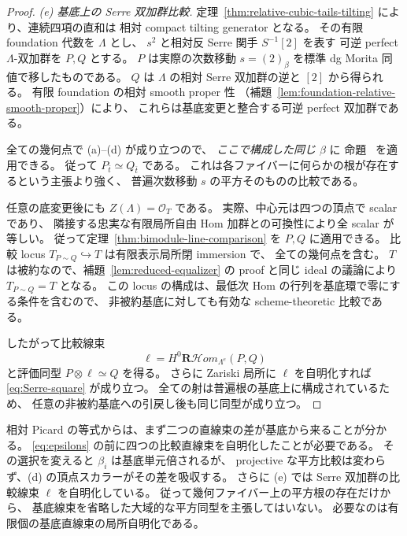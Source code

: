\begin{proof}
\emph{(e) 基底上の Serre 双加群比較.}
定理~\ref{thm:relative-cubic-tails-tilting} により、連続四項の直和は
相対 compact tilting generator となる。
その有限 foundation 代数を $\Lambda$ とし、
$s^2$ と相対反 Serre 関手 $S^{-1}[2]$ を表す
可逆 perfect $\Lambda$-双加群を $P,Q$ とする。
$P$ は実際の次数移動 $s=(2)_\beta$ を標準 dg Morita 同値で移したものである。
$Q$ は $\Lambda$ の相対 Serre 双加群の逆と $[2]$ から得られる。
有限 foundation の相対 smooth proper 性
（補題~\ref{lem:foundation-relative-smooth-proper}）により、
これらは基底変更と整合する可逆 perfect 双加群である。

全ての幾何点で (a)--(d) が成り立つので、
\emph{ここで構成した同じ $\beta$} に
命題~\cite[\texttt{prop:admissible-period-h2}]{QuadricIntrinsic2026} を適用できる。
従って $P_{\bar t}\simeq Q_{\bar t}$ である。
これは各ファイバーに何らかの根が存在するという主張より強く、
普遍次数移動 $s$ の平方そのものの比較である。

任意の底変更後にも $Z(\Lambda)=\mathcal O_T$ である。
実際、中心元は四つの頂点で scalar であり、
隣接する忠実な有限局所自由 Hom 加群との可換性により全 scalar が等しい。
従って定理~\ref{thm:bimodule-line-comparison} を $P,Q$ に適用できる。
比較 locus $T_{P\sim Q}\hookrightarrow T$ は有限表示局所閉 immersion で、
全ての幾何点を含む。
$T$ は被約なので、補題~\ref{lem:reduced-equalizer} の proof と同じ ideal の議論により
$T_{P\sim Q}=T$ となる。
この locus の構成は、最低次 Hom の行列を基底環で零にする条件を含むので、
非被約基底に対しても有効な scheme-theoretic 比較である。

したがって比較線束
\[
 \ell=H^0\mathbf R\mathcal Hom_{\Lambda^e}(P,Q)
\]
と評価同型 $P\otimes\ell\simeq Q$ を得る。
さらに Zariski 局所に $\ell$ を自明化すれば
\eqref{eq:Serre-square} が成り立つ。
全ての射は普遍根の基底上に構成されているため、
任意の非被約基底への引戻し後も同じ同型が成り立つ。
\end{proof}



\begin{remark}[比較線束の局所自明化]
相対 Picard の等式からは、まず二つの直線束の差が基底から来ることが分かる。
\eqref{eq:epsilons} の前に四つの比較直線束を自明化したことが必要である。
その選択を変えると $\beta_i$ は基底単元倍されるが、
projective な平方比較は変わらず、(d) の頂点スカラーがその差を吸収する。
さらに (e) では Serre 双加群の比較線束 $\ell$ を自明化している。
従って幾何ファイバー上の平方根の存在だけから、
基底線束を省略した大域的な平方同型を主張してはいない。
必要なのは有限個の基底直線束の局所自明化である。
\end{remark}

